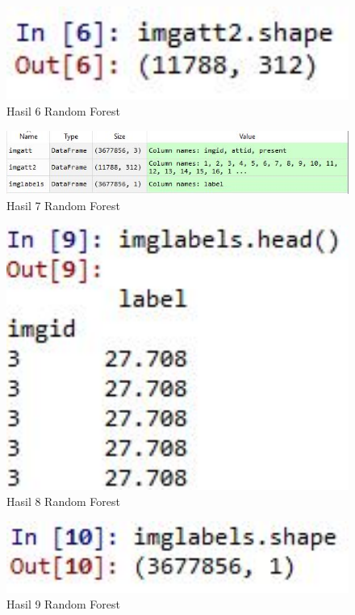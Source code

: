 \begin{figure}[ht]
	\centerline{\includegraphics[width=1\textwidth]{figures/huda/chapter3_praktek/9.JPG}}
	\caption{Hasil 6 Random Forest}
	\label{h13}
\end{figure}

\begin{figure}[ht]
	\centerline{\includegraphics[width=1\textwidth]{figures/huda/chapter3_praktek/10.JPG}}
	\caption{Hasil 7 Random Forest}
	\label{h14}
\end{figure}

\begin{figure}[ht]
	\centerline{\includegraphics[width=1\textwidth]{figures/huda/chapter3_praktek/11.JPG}}
	\caption{Hasil 8 Random Forest}
	\label{h15}
\end{figure}

\begin{figure}[ht]
	\centerline{\includegraphics[width=1\textwidth]{figures/huda/chapter3_praktek/12.JPG}}
	\caption{Hasil 9 Random Forest}
	\label{h16}
\end{figure}

